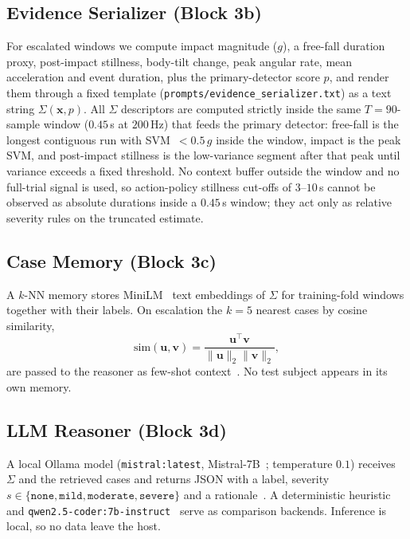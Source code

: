 \documentclass[journal]{IEEEtran}
\begin{document}


\subsection{Evidence Serializer (Block 3b)}
For escalated windows we compute impact magnitude ($g$), a free-fall duration proxy, post-impact stillness, body-tilt change, peak angular rate, mean acceleration and event duration, plus the primary-detector score $p$, and render them through a fixed template (\texttt{prompts/evidence\_serializer.txt}) as a text string $\Sigma(\mathbf{x},p)$. All $\Sigma$ descriptors are computed strictly inside the same $T{=}90$-sample window ($0.45$\,s at $200$\,Hz) that feeds the primary detector: free-fall is the longest contiguous run with SVM~$<0.5\,g$ inside the window, impact is the peak SVM, and post-impact stillness is the low-variance segment after that peak until variance exceeds a fixed threshold. No context buffer outside the window and no full-trial signal is used, so action-policy stillness cut-offs of $3$--$10$\,s cannot be observed as absolute durations inside a $0.45$\,s window; they act only as relative severity rules on the truncated estimate.

\subsection{Case Memory (Block 3c)}
A $k$-NN memory stores MiniLM~\cite{minilm2020} text embeddings of $\Sigma$ for training-fold windows together with their labels. On escalation the $k{=}5$ nearest cases by cosine similarity,
\begin{equation}
\mathrm{sim}(\mathbf{u},\mathbf{v})=\frac{\mathbf{u}^\top\mathbf{v}}{\|\mathbf{u}\|_2\|\mathbf{v}\|_2},
\label{eq:cosine}
\end{equation}
are passed to the reasoner as few-shot context~\cite{lewis2020rag}. No test subject appears in its own memory.

\subsection{LLM Reasoner (Block 3d)}
A local Ollama model (\texttt{mistral:latest}, Mistral-7B~\cite{mistral2023}; temperature $0.1$) receives $\Sigma$ and the retrieved cases and returns JSON with a label, severity $s\in\{\texttt{none},\texttt{mild},\texttt{moderate},\texttt{severe}\}$ and a rationale~\cite{wei2022cot,ollama}. A deterministic heuristic and \texttt{qwen2.5-coder:7b-instruct}~\cite{qwen2024} serve as comparison backends. Inference is local, so no data leave the host.
\end{document}
